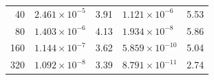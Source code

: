 \documentclass[10pt]{beamer}
\begin{document}
\begin{frame}
\begin{table}
\begin{tabular}{r*{4}l}
      40    & \( 2.461 \times 10^{ -5} \)   & 3.91                          & \( 1.121 \times 10^{ -6} \) & 5.53  \\
      80    & \( 1.403 \times 10^{ -6} \)   & 4.13                          & \( 1.934 \times 10^{ -8} \) & 5.86  \\
      160   & \( 1.144 \times 10^{ -7} \)   & 3.62                          & \( 5.859 \times 10^{-10} \) & 5.04  \\
      320   & \( 1.092 \times 10^{ -8} \)   & 3.39                          & \( 8.791 \times 10^{-11} \) & 2.74  \\
      \bottomrule
    \end{tabular}
  \end{table}
\end{frame}
\end{document}
